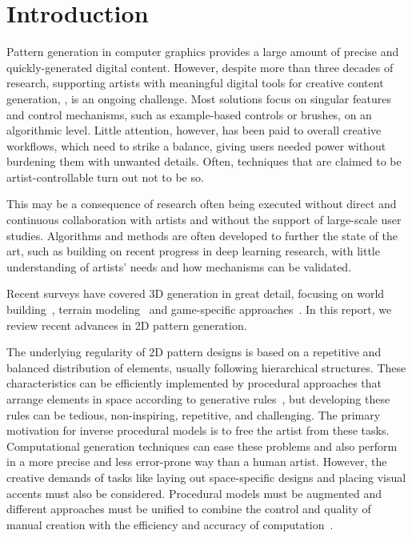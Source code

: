 \section{Introduction}
Pattern generation in computer graphics provides a large amount of precise and quickly-generated digital content. However, despite more than three decades of research, supporting artists with meaningful digital tools for creative content generation, , is an ongoing challenge. Most solutions focus on singular features and control mechanisms, such as example-based controls or brushes, on an algorithmic level. Little attention, however, has been paid to overall creative workflows, which need to strike a balance, giving users needed power without burdening them with unwanted details. Often, techniques that are claimed to be artist-controllable turn out not to be so.

This may be a consequence of research often being executed without direct and continuous collaboration with artists and without the support of large-scale user studies. Algorithms and methods are often developed to further the state of the art, such as building on recent progress in deep learning research, with little understanding of artists' needs and how mechanisms can be validated.

Recent surveys have covered 3D generation in great detail, focusing on  world building~\cite{smelik_2014_aso, aliaga_2016_ipm}, terrain modeling~\cite{galin_2019_aro} and game-specific approaches~\cite{hendrikx_2013_pcg, togelius_2011_sbp}. In this report, we review recent advances in 2D pattern generation. 

The underlying regularity of 2D pattern designs is based on a repetitive and balanced distribution of elements, usually following hierarchical structures. These characteristics can be efficiently implemented by procedural approaches that arrange elements in space according to generative rules~\cite{stava_2010_ipm}, but developing these rules can be tedious, non-inspiring, repetitive, and challenging. The primary motivation for inverse procedural models is to free the artist from these tasks. Computational generation techniques can ease these problems and also perform in a more precise and less error-prone way than a human artist. However, the creative demands of tasks like laying out space-specific designs and placing visual accents must also be considered. Procedural models must be augmented and different approaches must be unified to combine the control and quality of manual creation with the efficiency and accuracy of computation~\cite{gieseke_2017_ooo}. 

